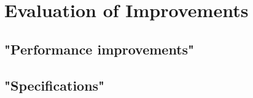 \section{Evaluation of Improvements}
	\subsection{"Performance improvements"}
	
	\subsection{"Specifications"}
	
	
	
	
	
	
